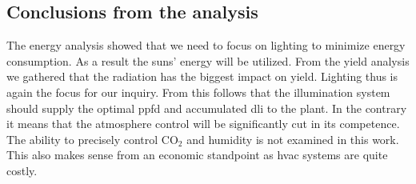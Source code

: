 








\subsection{Conclusions from the analysis}
\label{sub:conc-analysis}
The energy analysis showed that we need to focus on lighting to minimize energy consumption.
As a result the suns' energy will be utilized.
From the yield analysis we gathered that the radiation has the biggest impact on yield.
Lighting thus is again the focus for our inquiry.
From this follows that the illumination system should supply the optimal \ac{ppfd} and accumulated \ac{dli} to the plant.
In the contrary it means that the atmosphere control will be significantly cut in its competence.
The ability to precisely control CO$_2$ and humidity is not examined in this work.
This also makes sense from an economic standpoint as \ac{hvac} systems are quite costly.

